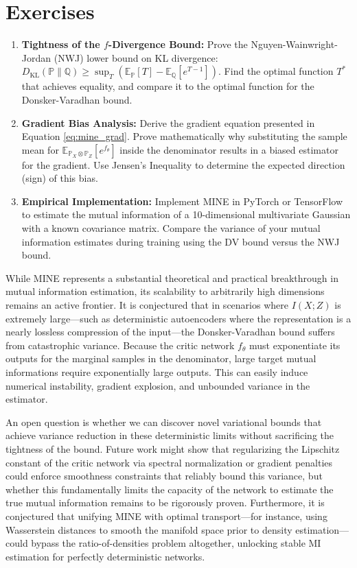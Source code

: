 \section*{Exercises}

\begin{enumerate}
    \item \textbf{Tightness of the $f$-Divergence Bound:} Prove the Nguyen-Wainwright-Jordan (NWJ) lower bound on KL divergence: $D_{\text{KL}}(\mathbb{P} \parallel \mathbb{Q}) \geq \sup_T \left( \mathbb{E}_{\mathbb{P}}[T] - \mathbb{E}_{\mathbb{Q}}[e^{T - 1}] \right)$. Find the optimal function $T^*$ that achieves equality, and compare it to the optimal function for the Donsker-Varadhan bound.
    \item \textbf{Gradient Bias Analysis:} Derive the gradient equation presented in Equation \ref{eq:mine_grad}. Prove mathematically why substituting the sample mean for $\mathbb{E}_{\mathbb{P}_X \otimes \mathbb{P}_Z}[e^{f_\theta}]$ inside the denominator results in a biased estimator for the gradient. Use Jensen's Inequality to determine the expected direction (sign) of this bias.
    \item \textbf{Empirical Implementation:} Implement MINE in PyTorch or TensorFlow to estimate the mutual information of a 10-dimensional multivariate Gaussian with a known covariance matrix. Compare the variance of your mutual information estimates during training using the DV bound versus the NWJ bound.
\end{enumerate}

\begin{horizon}
While MINE represents a substantial theoretical and practical breakthrough in mutual information estimation, its scalability to arbitrarily high dimensions remains an active frontier. It is conjectured that in scenarios where $I(X; Z)$ is extremely large---such as deterministic autoencoders where the representation is a nearly lossless compression of the input---the Donsker-Varadhan bound suffers from catastrophic variance. Because the critic network $f_\theta$ must exponentiate its outputs for the marginal samples in the denominator, large target mutual informations require exponentially large outputs. This can easily induce numerical instability, gradient explosion, and unbounded variance in the estimator.

An open question is whether we can discover novel variational bounds that achieve variance reduction in these deterministic limits without sacrificing the tightness of the bound. Future work might show that regularizing the Lipschitz constant of the critic network via spectral normalization or gradient penalties could enforce smoothness constraints that reliably bound this variance, but whether this fundamentally limits the capacity of the network to estimate the true mutual information remains to be rigorously proven. Furthermore, it is conjectured that unifying MINE with optimal transport---for instance, using Wasserstein distances to smooth the manifold space prior to density estimation---could bypass the ratio-of-densities problem altogether, unlocking stable MI estimation for perfectly deterministic networks.
\end{horizon}

